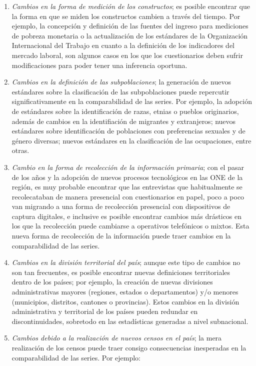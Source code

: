 \documentclass[
  12pt,
]{book}
\providecommand{\tightlist}{%
  \setlength{\itemsep}{0pt}\setlength{\parskip}{0pt}}
\begin{document}
\begin{enumerate}
\def\labelenumi{\arabic{enumi}.}
\tightlist
\item
  \emph{Cambios en la forma de medición de los constructos}; es posible encontrar que la forma en que se miden los constructos cambien a través del tiempo. Por ejemplo, la concepción y definición de las fuentes del ingreso \citep{CEPAL_2018} para mediciones de pobreza monetaria o la actualización de los estándares de la Organización Internacional del Trabajo \citep{ILO_2013} en cuanto a la definición de los indicadores del mercado laboral, son algunos casos en los que los cuestionarios deben sufrir modificaciones para poder tener una inferencia oportuna.
\item
  \emph{Cambios en la definición de las subpoblaciones}; la generación de nuevos estándares sobre la clasificación de las subpoblaciones puede repercutir significativamente en la comparabilidad de las series. Por ejemplo, la adopción de estándares sobre la identificación de razas, etnias o pueblos originarios, además de cambios en la identifiación de migrantes y extranjeros; nuevos estándares sobre identificación de poblaciones con preferencias sexuales y de género diversas; nuevos estándares en la clasificación de las ocupaciones, entre otras.
\item
  \emph{Cambio en la forma de recolección de la información primaria}; con el pasar de los años y la adopción de nuevos procesos tecnológicos en las ONE de la región, es muy probable encontrar que las entrevistas que habitualmente se recolecataban de manera presencial con cuestionarios en papel, poco a poco van migrando a una forma de recolección presencial con dispositivos de captura digitales, e inclusive es posible encontrar cambios más drásticos en los que la recolección puede cambiarse a operativos telefónicos o mixtos. Esta nueva forma de recolección de la información puede traer cambios en la comparabilidad de las series.
\item
  \emph{Cambios en la división territorial del país}; aunque este tipo de cambios no son tan frecuentes, es posible encontrar nuevas definiciones territoriales dentro de los países; por ejemplo, la creación de nuevas divisiones administrativas mayores (regiones, estados o departamentos) y/o menores (municipios, distritos, cantones o provincias). Estos cambios en la división administrativa y territorial de los países pueden redundar en discontinuidades, sobretodo en las estadísticas generadas a nivel subnacional.
\item
  \emph{Cambios debido a la realización de nuevos censos en el país}; la mera realización de los censos puede traer consigo consecuencias inesperadas en la comparabilidad de las series. Por ejemplo:


\end{enumerate}
\end{document}
